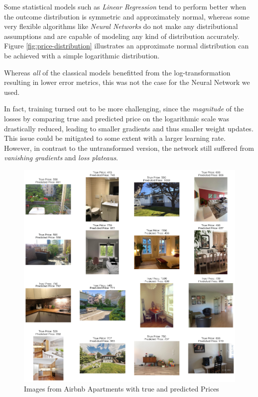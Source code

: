 \documentclass[12pt, letterpaper]{article}
\begin{document}
Some statistical models such as \emph{Linear Regression} tend to perform better when the outcome distribution is symmetric and approximately normal, whereas some very flexible algorithms like \emph{Neural Networks} do not make any distributional assumptions and are capable of modeling any kind of distribution accurately.
Figure \ref{fig:price-distribution} illustrates an approximate normal distribution can be achieved with a simple logarithmic distribution.

Whereas \emph{all} of the classical models benefitted from the log-transformation resulting in lower error metrics, this was not the case for the Neural Network we used.

In fact, training turned out to be more challenging, since the \emph{magnitude} of the losses by comparing true and predicted price on the logarithmic scale was drastically reduced, leading to smaller gradients and thus smaller weight updates.
This issue could be mitigated to some extent with a larger learning rate.
However, in contrast to the untransformed version, the network still suffered from \emph{vanishing gradients} and \emph{loss plateaus}.



\newpage




\appendix

\begin{figure}[t]
    \centering
    \includegraphics[width=\textwidth]{cnn_examples.png}
    \caption{Images from Airbnb Apartments with true and predicted Prices}
    \label{fig:cnn-examples}
\end{figure}
\end{document}
